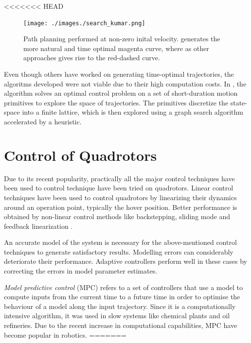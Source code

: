 <<<<<<< HEAD
\begin{figure}[h!]
\centering
\texttt{[image: ./images./search\_kumar.png]}
\caption{Path planning performed at non-zero inital velocity. \cite{kumar2017search} generates the more natural and time optimal magenta curve, where as other approaches gives rise to the red-dashed curve.}
\label{fig:search_kumar}
\end{figure}

Even though others have worked on generating time-optimal trajectories, the algoritms developed were not viable due to their high computation costs. In \cite{kumar2017search}, the algorithm solves an optimal control problem on a set of short-duration motion primitives to explore the space of trajectories. The primitives discretize the state-space into a finite lattice, which is then explored using a graph search algorithm accelerated by a heuristic. 

\section{Control of Quadrotors}
\label{sec:control_quadrotors}
Due to its recent popularity, practically all the major control techniques have been used to control technique have been tried on quadrotors. Linear control techniques \cite{seigwart2004pid} have been used to control quadrotors by linearizing their dynamics around an operation point, typically the hover position. Better performance is obtained by non-linear control methods like backstepping, sliding mode \cite{seigwart2005backstepping} and feedback linearization \cite{lewis2009dynamic}.

An accurate model of the system is necessary for the above-mentioned control techniques to generate satisfactory results. Modelling errors can considerably deteriorate their performance. Adaptive controllers \cite{kumar2011design} perform well in these cases by correcting the errors in model parameter estimates.

\textit{Model predictive control} (MPC) refers to a set of controllers that use a model to compute inputs from the current time to a future time in order to optimise the behaviour of a model along the input trajectory. Since it is a computationally intensive algorithm, it was used in slow systems like chemical plants and oil refineries. Due to the recent increase in computational capabilities, MPC have become popular in robotics. 
=======

